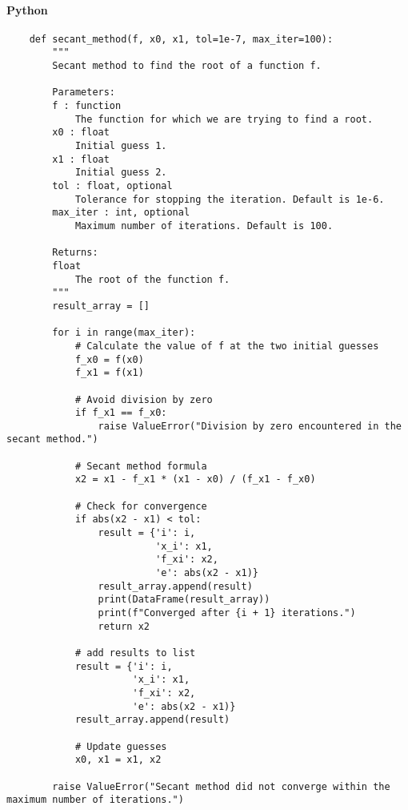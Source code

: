 \documentclass{article}
\begin{document}
            \paragraph{Python}
                \begin{verbatim}
    def secant_method(f, x0, x1, tol=1e-7, max_iter=100):
        """
        Secant method to find the root of a function f.

        Parameters:
        f : function
            The function for which we are trying to find a root.
        x0 : float
            Initial guess 1.
        x1 : float
            Initial guess 2.
        tol : float, optional
            Tolerance for stopping the iteration. Default is 1e-6.
        max_iter : int, optional
            Maximum number of iterations. Default is 100.

        Returns:
        float
            The root of the function f.
        """
        result_array = []

        for i in range(max_iter):
            # Calculate the value of f at the two initial guesses
            f_x0 = f(x0)
            f_x1 = f(x1)

            # Avoid division by zero
            if f_x1 == f_x0:
                raise ValueError("Division by zero encountered in the secant method.")

            # Secant method formula
            x2 = x1 - f_x1 * (x1 - x0) / (f_x1 - f_x0)

            # Check for convergence
            if abs(x2 - x1) < tol:
                result = {'i': i,
                          'x_i': x1,
                          'f_xi': x2,
                          'e': abs(x2 - x1)}
                result_array.append(result)
                print(DataFrame(result_array))
                print(f"Converged after {i + 1} iterations.")
                return x2

            # add results to list
            result = {'i': i,
                      'x_i': x1,
                      'f_xi': x2,
                      'e': abs(x2 - x1)}
            result_array.append(result)

            # Update guesses
            x0, x1 = x1, x2

        raise ValueError("Secant method did not converge within the maximum number of iterations.")
                \end{verbatim}
\end{document}
